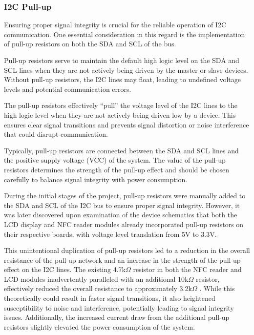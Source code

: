 \subsubsection*{I2C Pull-up}
Ensuring proper signal integrity is crucial for the reliable operation of I2C communication. One essential consideration 
in this regard is the implementation of pull-up resistors on both the SDA and SCL of the bus.

Pull-up resistors serve to maintain the default high logic level on the SDA and SCL lines when they are not actively 
being driven by the master or slave devices. Without pull-up resistors, the I2C lines may float, leading to undefined 
voltage levels and potential communication errors.

The pull-up resistors effectively ``pull'' the voltage level of the I2C lines to the high logic level when they are not 
actively being driven low by a device. This ensures clear signal transitions and prevents signal distortion or noise 
interference that could disrupt communication.

Typically, pull-up resistors are connected between the SDA and SCL lines and the positive supply voltage (VCC) of the 
system. The value of the pull-up resistors determines the strength of the pull-up effect and should be chosen carefully 
to balance signal integrity with power consumption.

During the initial stages of the project, pull-up resistors were manually added to the SDA and SCL of the I2C bus to 
ensure proper signal integrity. However, it was later discovered upon examination of the device schematics that both the 
LCD display and NFC reader modules already incorporated pull-up resistors on their respective boards, with voltage level 
translation from 5V to 3.3V.

This unintentional duplication of pull-up resistors led to a reduction in the overall resistance of the pull-up network 
and an increase in the strength of the pull-up effect on the I2C lines. The existing 4.7k$\Omega$ resistor in both the NFC 
reader and LCD modules inadvertently paralleled with an additional 10k$\Omega$ resistor, effectively reduced the overall 
resistance to approximately 3.2k$\Omega$ \cite{pn532_elechouse_schematics}. While this theoretically could result in faster 
signal transitions, it also heightened susceptibility to noise and interference, potentially leading to signal integrity 
issues. Additionally, the increased current draw from the additional pull-up resistors slightly elevated the power 
consumption of the system.

